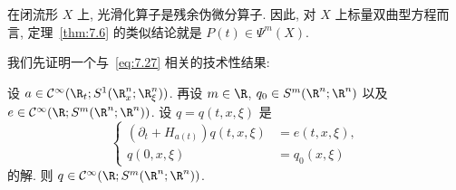 在闭流形 $X$ 上, 光滑化算子是残余伪微分算子. 因此, 对 $X$ 上标量双曲型方程而言, 定理~\ref{thm:7.6} 的类似结论就是 $P(t) \in \Psi^m(X)$.

我们先证明一个与~\eqref{eq:7.27} 相关的技术性结果:

\begin{lemma}[符号的输运]\label{lem:7.7}
设 $a \in \Smooth(\R_t; S^1(\R^n_x; \R^n_\xi))$. 再设 $m \in \R$, $q_0 \in S^m(\R^n; \R^n)$ 以及 $e \in \Smooth(\R; S^m(\R^n; \R^n))$. 设 $q = q(t, x, \xi)$ 是
\begin{equation}\label{eq:7.28}
    \left\{
    \begin{aligned}
        (\partial_t + H_{a(t)}) q(t, x, \xi) &= e(t, x, \xi), \\
        q(0, x, \xi) &= q_0(x, \xi)
    \end{aligned}
    \right.
\end{equation}
的解. 则 $q \in \Smooth(\R; S^m(\R^n; \R^n))$.
\end{lemma}

